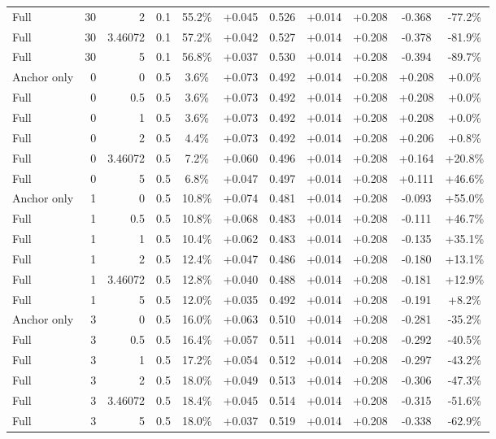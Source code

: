 \begin{table}[htbp]
\begin{tabular}{lrrrccccccc}
Full & 30 & 2 & 0.1 & 55.2\% & +0.045 & 0.526 & +0.014 & +0.208 & -0.368 & -77.2\% \\
Full & 30 & 3.46072 & 0.1 & 57.2\% & +0.042 & 0.527 & +0.014 & +0.208 & -0.378 & -81.9\% \\
Full & 30 & 5 & 0.1 & 56.8\% & +0.037 & 0.530 & +0.014 & +0.208 & -0.394 & -89.7\% \\
Anchor only & 0 & 0 & 0.5 & 3.6\% & +0.073 & 0.492 & +0.014 & +0.208 & +0.208 & +0.0\% \\
Full & 0 & 0.5 & 0.5 & 3.6\% & +0.073 & 0.492 & +0.014 & +0.208 & +0.208 & +0.0\% \\
Full & 0 & 1 & 0.5 & 3.6\% & +0.073 & 0.492 & +0.014 & +0.208 & +0.208 & +0.0\% \\
Full & 0 & 2 & 0.5 & 4.4\% & +0.073 & 0.492 & +0.014 & +0.208 & +0.206 & +0.8\% \\
Full & 0 & 3.46072 & 0.5 & 7.2\% & +0.060 & 0.496 & +0.014 & +0.208 & +0.164 & +20.8\% \\
Full & 0 & 5 & 0.5 & 6.8\% & +0.047 & 0.497 & +0.014 & +0.208 & +0.111 & +46.6\% \\
Anchor only & 1 & 0 & 0.5 & 10.8\% & +0.074 & 0.481 & +0.014 & +0.208 & -0.093 & +55.0\% \\
Full & 1 & 0.5 & 0.5 & 10.8\% & +0.068 & 0.483 & +0.014 & +0.208 & -0.111 & +46.7\% \\
Full & 1 & 1 & 0.5 & 10.4\% & +0.062 & 0.483 & +0.014 & +0.208 & -0.135 & +35.1\% \\
Full & 1 & 2 & 0.5 & 12.4\% & +0.047 & 0.486 & +0.014 & +0.208 & -0.180 & +13.1\% \\
Full & 1 & 3.46072 & 0.5 & 12.8\% & +0.040 & 0.488 & +0.014 & +0.208 & -0.181 & +12.9\% \\
Full & 1 & 5 & 0.5 & 12.0\% & +0.035 & 0.492 & +0.014 & +0.208 & -0.191 & +8.2\% \\
Anchor only & 3 & 0 & 0.5 & 16.0\% & +0.063 & 0.510 & +0.014 & +0.208 & -0.281 & -35.2\% \\
Full & 3 & 0.5 & 0.5 & 16.4\% & +0.057 & 0.511 & +0.014 & +0.208 & -0.292 & -40.5\% \\
Full & 3 & 1 & 0.5 & 17.2\% & +0.054 & 0.512 & +0.014 & +0.208 & -0.297 & -43.2\% \\
Full & 3 & 2 & 0.5 & 18.0\% & +0.049 & 0.513 & +0.014 & +0.208 & -0.306 & -47.3\% \\
Full & 3 & 3.46072 & 0.5 & 18.4\% & +0.045 & 0.514 & +0.014 & +0.208 & -0.315 & -51.6\% \\
Full & 3 & 5 & 0.5 & 18.0\% & +0.037 & 0.519 & +0.014 & +0.208 & -0.338 & -62.9\% \\

\end{tabular}
\end{table}
